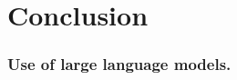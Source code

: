 \documentclass{llncs}
\begin{document}
\section{Conclusion}
\label{sec:conclusion}

\subsubsection*{Use of large language models.}

\printbibliography
\end{document}
